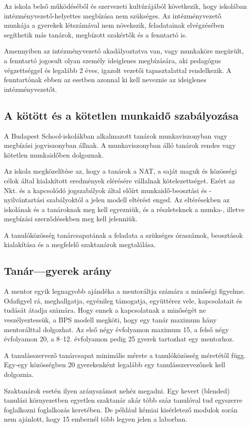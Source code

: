 Az iskola belső működéséből és szervezeti kultúrájából következik, hogy
iskolában intézményvezető-helyettes megbízása nem szükséges. Az
intézményvezető munkája a gyerekek létszámával nem növekszik, feladatainak
elvégzésében segíthetik más tanárok, megbízott szakértők és a fenntartó
is.

Amennyiben az intézményvezető akadályoztatva van, vagy munkaköre
megürült, a fenntartó jogosult olyan személy ideiglenes megbízására, aki
pedagógus végzettséggel és legalább 2 éves, igazolt vezetői
tapasztalattal rendelkezik. A fenntartónak ebben az esetben azonnal ki
kell neveznie az ideiglenes intézményvezetőt.

\hypertarget{kotott-es-kotetlen-munkaido-szabalyozasa}{%
\subsection{A kötött és a kötetlen munkaidő
szabályozása}\label{kotott-es-kotetlen-munkaido-szabalyozasa}}

A Budapest School-iskolákban alkalmazott tanárok munkaviszonyban\break
vagy
megbízási jogviszonyban állnak. A munkaviszonyban álló tanárok rendes
vagy kötetlen munkaidőben dolgoznak.

Az iskola megközelítése az, hogy a tanárok a NAT, a saját maguk és közösségi
célok által kialakított eredmények elérésére vállalnak kötelezettséget.
Ezért az Nkt. és a kapcsolódó jogszabályok által előírt munkaidő-beosztási
és -nyilvántartási szabályoktól a jelen modell eltérést enged. Az
eltérésekben az iskolának és a tanároknak meg kell egyezniük, és a
részleteknek a munka-, illetve megbízási szerződésekben meg kell
jelenniük.

A tanulóközösség tanárcsapatának a feladata a szükséges óraszámok,
beosztások kialakítása és a megfelelő szaktanárok megtalálása.

\hypertarget{tanar---gyerek-arany}{%
\subsection{Tanár---gyerek arány}\label{tanar---gyerek-arany}}

A mentor egyik legnagyobb ajándéka a mentoráltja számára a minőségi
figyelme. Odafigyel rá, meghallgatja, egyénileg támogatja, együttérez
vele, kapcsolatait és tudását átadja számára. Hogy ennek a kapcsolatnak
a minőségét ne veszélyeztessük, a BPS modell megköti, hogy egy tanár
maximum hány mentorálttal dolgozhat. Az első négy évfolyamon maximum 15,
a felső négy évfolyamon 20, a 8--12. évfolyamon pedig 25 gyerek tartozhat
egy mentorhoz.

A tanulásszervező tanárcsapat minimális mérete a tanulóközösség
méretétől függ. Egy-egy közösségben 20 gyerekenként legalább egy
tanulásszervezőnek kell dolgoznia.

Szaktanárok esetén ilyen arányszámot nehéz megadni. Egy kevert\break
(blended)
tanulási környezetben egyetlen szaktanár akár több száz tanulóval tud
egyszerre foglalkozni foglalkozás keretében. De például kémiai kisérletező
modulok során nem ajánlott, hogy 15 embernél több legyen jelen a laborban.
